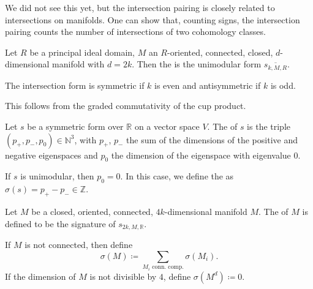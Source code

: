 

\begin{oral}
  We did not see this yet, but the intersection pairing
  is closely related to intersections on manifolds.
  One can show that, counting signs, the intersection pairing
  counts the number of intersections of two
  cohomology classes.
\end{oral}

\begin{definition}
  \label{def:unimodular-form-on-manifold-of-even-dimension}
  Let $R$ be a principal ideal domain,
  $M$ an $R$-oriented, connected, closed,
  $d$-dimensional manifold with $d=2k$.
  Then the  is the unimodular form
  $\overline{s_{k,M,R}}$.
\end{definition}

\begin{remark}
  The intersection form is symmetric if $k$ is even
  and antisymmetric if $k$ is odd.

  This follows from the graded commutativity of the cup product.
\end{remark}


\begin{definition}
  \label{def:signature-of-form}
  Let $s$ be a symmetric form over $\mathbb{R}$
  on a vector space $V$.
  The  of $s$ is the triple
  $(p_{+}, p_{-}, p_0) \in \mathbb{N}^3$,
  with $p_{+}$, $p_{-}$ the sum of the dimensions of the
  positive and negative eigenspaces and $p_0$ the dimension
  of the eigenspace with eigenvalue $0$.

  If $s$ is unimodular, then $p_0=0$.
  In this case, we define the   as
  $σ(s) = p_{+} - p_{-} \in \mathbb{Z}$.
\end{definition}

\begin{definition}
  \label{def:signature-of-manifold}
  Let $M$ be a closed, oriented, connected,
  $4k$-dimensional manifold $M$.
  The  of $M$ is defined to be the
  signature of $s_{2k, M, \mathbb{R}}$.

  If $M$ is not connected, then define
  \[
    σ(M) \coloneqq \sum_{\text{$M_i$ conn. comp.}} σ(M_i)
  .\]
  If the dimension of $M$ is not divisible by $4$,
  define $σ(M^d) \coloneqq 0$.
\end{definition}

